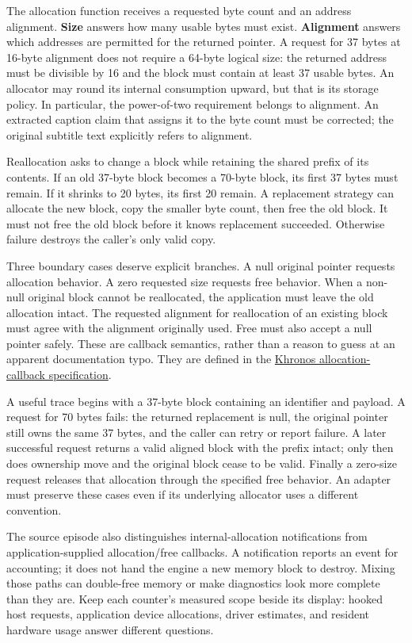 The allocation function receives a requested byte count and an address alignment. \textbf{Size} answers how many usable bytes must exist. \textbf{Alignment} answers which addresses are permitted for the returned pointer. A request for 37 bytes at 16-byte alignment does not require a 64-byte logical size: the returned address must be divisible by 16 and the block must contain at least 37 usable bytes. An allocator may round its internal consumption upward, but that is its storage policy. In particular, the power-of-two requirement belongs to alignment. An extracted caption claim that assigns it to the byte count must be corrected; the original subtitle text explicitly refers to alignment.

Reallocation asks to change a block while retaining the shared prefix of its contents. If an old 37-byte block becomes a 70-byte block, its first 37 bytes must remain. If it shrinks to 20 bytes, its first 20 remain. A replacement strategy can allocate the new block, copy the smaller byte count, then free the old block. It must not free the old block before it knows replacement succeeded. Otherwise failure destroys the caller's only valid copy.

Three boundary cases deserve explicit branches. A null original pointer requests allocation behavior. A zero requested size requests free behavior. When a non-null original block cannot be reallocated, the application must leave the old allocation intact. The requested alignment for reallocation of an existing block must agree with the alignment originally used. Free must also accept a null pointer safely. These are callback semantics, rather than a reason to guess at an apparent documentation typo. They are defined in the \href{https://docs.vulkan.org/spec/latest/chapters/memory.html}{Khronos allocation-callback specification}.

A useful trace begins with a 37-byte block containing an identifier and payload. A request for 70 bytes fails: the returned replacement is null, the original pointer still owns the same 37 bytes, and the caller can retry or report failure. A later successful request returns a valid aligned block with the prefix intact; only then does ownership move and the original block cease to be valid. Finally a zero-size request releases that allocation through the specified free behavior. An adapter must preserve these cases even if its underlying allocator uses a different convention.

The source episode also distinguishes internal-allocation notifications from application-supplied allocation/free callbacks. A notification reports an event for accounting; it does not hand the engine a new memory block to destroy. Mixing those paths can double-free memory or make diagnostics look more complete than they are. Keep each counter's measured scope beside its display: hooked host requests, application device allocations, driver estimates, and resident hardware usage answer different questions.

